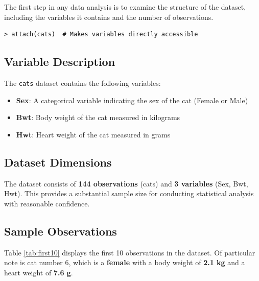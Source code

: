 \documentclass[a4paper,12pt]{article}
\begin{document}
The first step in any data analysis is to examine the structure of the dataset, including the variables it contains and the number of observations.

\begin{lstlisting}[caption={Loading the cats dataset}, label={lst:loading}]
> attach(cats)  # Makes variables directly accessible
\end{lstlisting}

\subsection{Variable Description}
\label{subsec:variables}

The \texttt{cats} dataset contains the following variables:
\begin{itemize}[leftmargin=1.5cm]
    \item \textbf{Sex}: A categorical variable indicating the sex of the cat (Female or Male)
    \item \textbf{Bwt}: Body weight of the cat measured in kilograms
    \item \textbf{Hwt}: Heart weight of the cat measured in grams
\end{itemize}

\subsection{Dataset Dimensions}
\label{subsec:dimensions}

The dataset consists of \textbf{144 observations} (cats) and \textbf{3 variables} (Sex, Bwt, Hwt). This provides a substantial sample size for conducting statistical analysis with reasonable confidence.

\subsection{Sample Observations}
\label{subsec:sample}

Table \ref{tab:first10} displays the first 10 observations in the dataset. Of particular note is cat number 6, which is a \textbf{female} with a body weight of \textbf{2.1 kg} and a heart weight of \textbf{7.6 g}.
\end{document}
